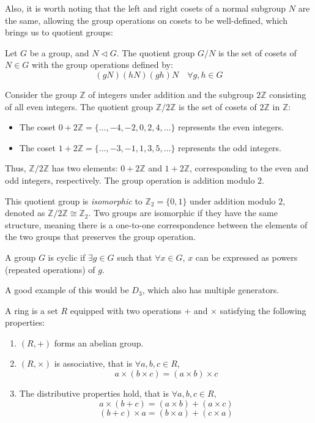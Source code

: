 \documentclass[12pt]{article}
\begin{document}
Also, it is worth noting that the left and right cosets of a normal subgroup $N$ are the same, allowing the group operations on cosets to be well-defined, which brings us to quotient groups:

\begin{definition}
    Let $G$ be a group, and $N \triangleleft G$. The quotient group $G / N$ is the set of cosets of $N \in G$ with the group operations defined by: $$(gN) (hN) (gh)N \quad \forall g, h \in G$$
\end{definition}

\begin{example}
    Consider the group $\mathbb{Z}$ of integers under addition and the subgroup $2\mathbb{Z}$ consisting of all even integers. The quotient group $\mathbb{Z}/2\mathbb{Z}$ is the set of cosets of $2\mathbb{Z}$ in $\mathbb{Z}$:

\begin{itemize}
\item The coset $0+2\mathbb{Z}=\{\ldots,-4,-2,0,2,4,\ldots\}$ represents the even integers.
\item The coset $1+2\mathbb{Z}=\{\ldots,-3,-1,1,3,5,\ldots\}$ represents the odd integers.
\end{itemize}

Thus, $\mathbb{Z}/2\mathbb{Z}$ has two elements: $0+2\mathbb{Z}$ and $1+2\mathbb{Z}$, corresponding to the even and odd integers, respectively. The group operation is addition modulo $2$.
\end{example}

This quotient group is \emph{isomorphic} to $\mathbb{Z}_2=\{0,1\}$ under addition modulo $2$, denoted as $\mathbb{Z}/2\mathbb{Z}\cong \mathbb{Z}_2$. Two groups are isomorphic if they have the same structure, meaning there is a one-to-one correspondence between the elements of the two groups that preserves the group operation.

\begin{definition}
    A group $G$ is cyclic if $\exists g \in G$ such that $\forall x \in G$, $x$ can be expressed as powers (repeated operations) of $g$. 
\end{definition}

A good example of this would be $D_3$, which also has multiple generators. 
\vspace{12pt}

\begin{definition}[Ring]
    A ring is a set $R$ equipped with two operations $+$ and $\times$ satisfying the following properties:
    \begin{enumerate}
        \item $(R, +)$ forms an abelian group. 
        \item $(R, \times)$ is associative, that is $\forall a, b, c \in R$, $$a \times (b \times c) = (a \times b) \times c$$ 
        \item The distributive properties hold, that is $\forall a, b, c \in R$, $$a \times (b + c) = (a \times b) + (a \times c) $$$$ (b + c) \times a = (b \times a) + (c \times a)$$
    \end{enumerate}
\end{definition}
\end{document}
